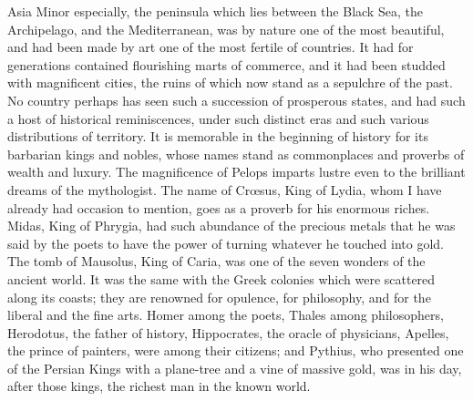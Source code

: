 Asia Minor especially, the
peninsula which lies between the Black Sea, the Archipelago, and the
Mediterranean, was by nature one of the most beautiful, and had been
made by art one of the most fertile of countries. It had for
generations contained flourishing marts of commerce, and it had been
studded with magnificent cities, the ruins of which now stand as a
sepulchre of the past. No country perhaps has seen such a succession
of prosperous states, and had such a host of historical reminiscences,
under such distinct eras and such various distributions of territory.
It is memorable in the beginning of history for its barbarian kings
and nobles, whose names stand as commonplaces and proverbs of wealth
and luxury. The magnificence of Pelops imparts lustre even to the
brilliant dreams of the mythologist. The name of Crœsus, King of
Lydia, whom I have already had occasion to mention, goes as a proverb
for his enormous riches. Midas, King of Phrygia, had such abundance of
the precious metals that he was said by the poets to have the power of
turning whatever he touched into gold. The tomb of Mausolus,
King of Caria, was one of the seven wonders of the ancient world. It
was the same with the Greek colonies which were scattered along its
coasts; they are renowned for opulence, for philosophy, and for the
liberal and the fine arts. Homer among the poets, Thales among
philosophers, Herodotus, the father of history, Hippocrates, the
oracle of physicians, Apelles, the prince of painters, were among
their citizens; and Pythius, who presented one of the Persian Kings
with a plane-tree and a vine of massive gold, was in his day, after
those kings, the richest man in the known world.

